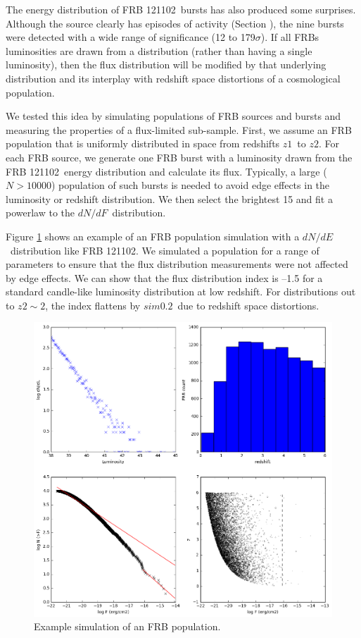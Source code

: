\documentclass[twocolumn]{aastex61}
\newcommand{\frb}{FRB 121102}
\begin{document}
The energy distribution of \frb\ bursts has also produced some surprises. Although the source clearly has episodes of activity (Section \label{sec:temp}), the nine bursts were detected with a wide range of significance (12 to 179$\sigma$). If all FRBs luminosities are drawn from a distribution (rather than having a single luminosity), then the flux distribution will be modified by that underlying distribution and its interplay with redshift space distortions of a cosmological population.

We tested this idea by simulating populations of FRB sources and bursts and measuring the properties of a flux-limited sub-sample. First, we assume an FRB population that is uniformly distributed in space from redshifts $z1$\ to $z2$. For each FRB source, we generate one FRB burst with a luminosity drawn from the \frb\ energy distribution and calculate its flux. Typically, a large ($N>10000$) population of such bursts is needed to avoid edge effects in the luminosity or redshift distribution. We then select the brightest 15 \citep[equal to the current sample size used in modeling;][]{2016ApJ...830...75V} and fit a powerlaw to the $dN/dF$\ distribution.

Figure \ref{fig:sim} shows an example of an FRB population simulation with a $dN/dE$\ distribution like \frb. We simulated a population for a range of parameters to ensure that the flux distribution measurements were not affected by edge effects. We can show that the flux distribution index is --1.5 for a standard candle-like luminosity distribution at low redshift. For distributions out to $z2\sim2$, the index flattens by $sim0.2$\ due to redshift space distortions.

\begin{figure}[htb]
\begin{center}
\includegraphics[width=0.9\columnwidth]{sim_L1.6}
\caption{Example simulation of an FRB population.
\label{fig:sim}}
\end{center}
\end{figure}
\end{document}
